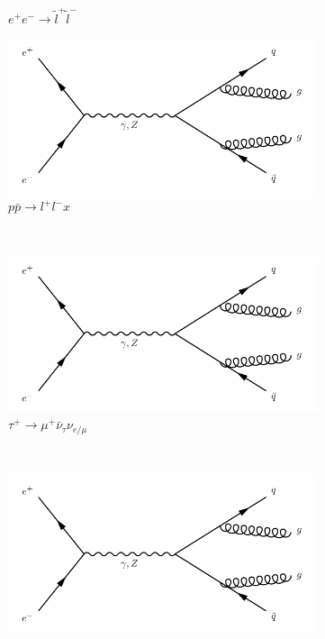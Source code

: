 \begin{figure}[h]
\begin{subfigure}[b]{0.3\textwidth}
    \caption{$e^+e^-\rightarrow \tilde{l}^+\tilde{l}^-$}
    \label{fey:3}
  \end{subfigure}
  \newline
  \newline
  \begin{subfigure}[b]{0.3\textwidth}
    \includegraphics[width=\textwidth]{../Diagrams/D1.pdf}
    \caption{$p\bar{p}\rightarrow l^+l^-x$}
    \label{fey:4}
  \end{subfigure}%
  ~
  \begin{subfigure}[b]{0.3\textwidth}
    \includegraphics[width=\textwidth]{../Diagrams/D1.pdf}
    \caption{$\tau^+\rightarrow \mu^+\bar{\nu}_{\tau}\nu_{e/\mu}$}
    \label{fey:5}
  \end{subfigure}%
  ~
  \begin{subfigure}[b]{0.3\textwidth}
    \includegraphics[width=\textwidth]{../Diagrams/D1.pdf}

\end{subfigure}
\end{figure}
